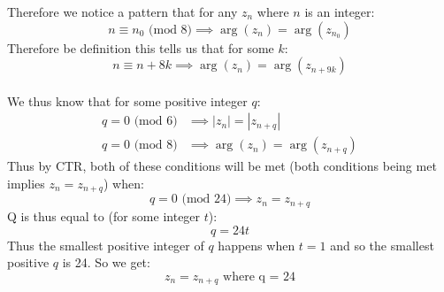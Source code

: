 \documentclass[11pt]{article}
\begin{document}
Therefore we notice a pattern that for any $z_n$ where $n$ is an integer:
\[ n \equiv n_0 \text{ (mod 8)} \implies  \arg(z_n) = \arg(z_{n_0}) \]
Therefore be definition this tells us that for some $k$:
\[ n \equiv n + 8k \implies  \arg(z_n) = \arg(z_{n+9k})\]\\
We thus know that for some positive integer $q$:
\begin{align*}
 q = 0 \text{ (mod 6)} & \implies |z_n| = |z_{n+q}|  \\
q = 0 \text{ (mod 8)} & \implies \arg(z_n) = \arg(z_{n+q})
\end{align*}
Thus by CTR, both of these conditions will be met (both conditions being met implies $z_n = z_{n+q}$) when:
\[ q = 0 \text{ (mod 24)} \implies z_n = z_{n+q} \]
Q is thus equal to (for some integer $t$):
\[ q = 24t \]
Thus the smallest positive integer of $q$ happens when $t = 1$ and so the smallest positive $q$ is 24. So we get:
\[ z_n = z_{n+q} \text{ where q = 24} \]
\end{document}
